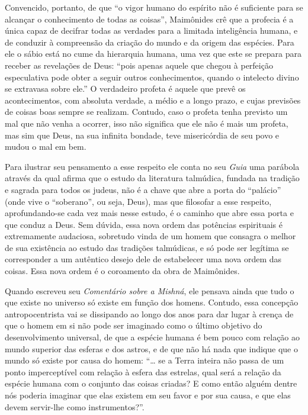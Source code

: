 Convencido, portanto, de que ``o vigor humano do espírito não é
suficiente para se alcançar o conhecimento de todas as coisas'',
Maimônides crê que a profecia é a única capaz de decifrar todas as
verdades para a limitada inteligência humana, e de conduzir à
compreensão da criação do mundo e da origem das espécies. Para ele o
sábio está no cume da hierarquia humana, uma vez que este se prepara
para receber as revelações de Deus: ``pois apenas aquele que chegou à
perfeição especulativa pode obter a seguir outros conhecimentos, quando
o intelecto divino se extravasa sobre ele.'' O verdadeiro profeta é
aquele que prevê os acontecimentos, com absoluta verdade, a médio e a
longo prazo, e cujas previsões de coisas boas sempre se realizam.
Contudo, caso o profeta tenha previsto um mal que não venha a ocorrer,
isso não significa que ele não é mais um profeta, mas sim que Deus, na
sua infinita bondade, teve misericórdia de seu povo e mudou o mal em
bem.

Para ilustrar seu pensamento a esse respeito ele conta no seu
\emph{Guia} uma parábola através da qual afirma que o estudo da
literatura talmúdica, fundada na tradição e sagrada para todos os
judeus, não é a chave que abre a porta do ``palácio'' (onde vive o
``soberano'', ou seja, Deus), mas que filosofar a esse respeito,
aprofundando-se cada vez mais nesse estudo, é o caminho que abre essa
porta e que conduz a Deus. Sem dúvida, essa nova ordem das potências
espirituais é extremamente audaciosa, sobretudo vinda de um homem que
consagra o melhor de sua existência ao estudo das tradições talmúdicas,
e só pode ser legítima se corresponder a um autêntico desejo dele de
estabelecer uma nova ordem das coisas. Essa nova ordem é o coroamento
da obra de Maimônides.

Quando escreveu seu \emph{Comentário sobre a Mishná}, ele pensava ainda
que tudo o que existe no universo só existe em função dos homens.
Contudo, essa concepção antropocentrista vai se dissipando ao longo dos
anos para dar lugar à crença de que o homem em si não pode ser imaginado
como o último objetivo do desenvolvimento universal, de que a espécie
humana é bem pouco com relação ao mundo superior das esferas e dos
astros, e de que não há nada que indique que o mundo só existe por causa
do homem: ``\ldots{} se a Terra inteira não passa de um ponto imperceptível
com relação à esfera das estrelas, qual será a relação da espécie
humana com o conjunto das coisas criadas? E como então alguém dentre nós
poderia imaginar que elas existem em seu favor e por sua causa, e que
elas devem servir-lhe como instrumentos?''.

